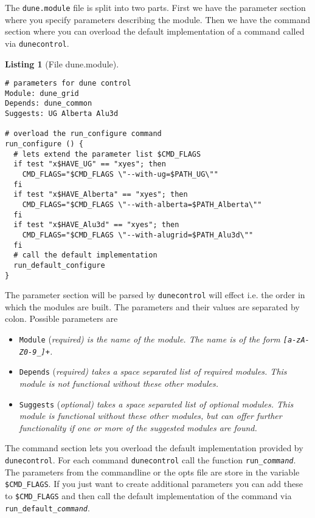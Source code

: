 \documentclass[11pt,a4paper,headinclude,footinclude,DIV16,normalheadings]{scrartcl}
\newtheorem{lst}{Listing}
\newcommand{\dunecontrol}{\texttt{dunecontrol}\xspace}
\newcommand{\dunemodule}{\texttt{dune.module}\xspace}
\begin{document}

The \dunemodule file is split into two parts. First we have the
parameter section where you specify parameters describing the module.
Then we have the command section where you can overload the default
implementation of a command called via \dunecontrol.

\begin{lst}[File dune.module] \mbox{}
\begin{lstlisting}
# parameters for dune control
Module: dune_grid
Depends: dune_common
Suggests: UG Alberta Alu3d

# overload the run_configure command
run_configure () {
  # lets extend the parameter list $CMD_FLAGS
  if test "x$HAVE_UG" == "xyes"; then
    CMD_FLAGS="$CMD_FLAGS \"--with-ug=$PATH_UG\""
  fi
  if test "x$HAVE_Alberta" == "xyes"; then
    CMD_FLAGS="$CMD_FLAGS \"--with-alberta=$PATH_Alberta\""
  fi  
  if test "x$HAVE_Alu3d" == "xyes"; then
    CMD_FLAGS="$CMD_FLAGS \"--with-alugrid=$PATH_Alu3d\""
  fi
  # call the default implementation
  run_default_configure
}
\end{lstlisting}
\end{lst}

The parameter section will be parsed by \dunecontrol will effect
i.e. the order in which the modules are built. The parameters and
their values are separated by colon. Possible parameters are
\begin{itemize}
\item \texttt{Module} (\em required\em) is the name of the module. The
  name is of the form \texttt{[a-zA-Z0-9\_]+}.
\item \texttt{Depends} (\em required\em) takes a space separated list
  of required modules. This module is not functional without these
  other modules.
\item \texttt{Suggests} (\em optional\em) takes a space separated list
  of optional modules. This module is functional without these
  other modules, but can offer further functionality if one or more of
  the suggested modules are found.
\end{itemize}

The command section lets you overload the default implementation
provided by \dunecontrol. For each command \dunecontrol call the
function \texttt{run\_\textit{command}}. The parameters from the
commandline or the opts file are store in the variable
\texttt{\$CMD\_FLAGS}. If you just want to create additional parameters
you can add these to \texttt{\$CMD\_FLAGS} and then call the default
implementation of the command via
\texttt{run\_default\_\textit{command}}.
\end{document}
